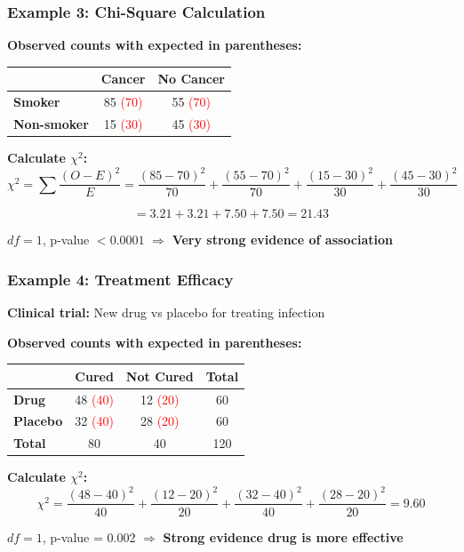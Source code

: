 \documentclass{beamer}
\begin{document}
\begin{frame}
\frametitle{Example 3: Chi-Square Calculation}

\textbf{Observed counts with expected in parentheses:}
\begin{center}
\begin{tabular}{l|cc}
& \textbf{Cancer} & \textbf{No Cancer} \\
\hline
\textbf{Smoker} & 85 \textcolor{red}{(70)} & 55 \textcolor{red}{(70)} \\
\textbf{Non-smoker} & 15 \textcolor{red}{(30)} & 45 \textcolor{red}{(30)} \\
\end{tabular}
\end{center}

\vspace{0.3cm}
\textbf{Calculate $\chi^2$:}
\small
$$\chi^2 = \sum \frac{(O-E)^2}{E} = \frac{(85-70)^2}{70} + \frac{(55-70)^2}{70} + \frac{(15-30)^2}{30} + \frac{(45-30)^2}{30}$$

$$= 3.21 + 3.21 + 7.50 + 7.50 = 21.43$$

\normalsize
$df = 1$, p-value $< 0.0001$ $\Rightarrow$ \textbf{Very strong evidence of association}
\end{frame}

\begin{frame}
\frametitle{Example 4: Treatment Efficacy}
\textbf{Clinical trial:} New drug vs placebo for treating infection

\vspace{0.3cm}
\textbf{Observed counts with expected in parentheses:}
\begin{center}
\begin{tabular}{l|cc|c}
& \textbf{Cured} & \textbf{Not Cured} & \textbf{Total} \\
\hline
\textbf{Drug} & 48 \textcolor{red}{(40)} & 12 \textcolor{red}{(20)} & 60 \\
\textbf{Placebo} & 32 \textcolor{red}{(40)} & 28 \textcolor{red}{(20)} & 60 \\
\hline
\textbf{Total} & 80 & 40 & 120 \\
\end{tabular}
\end{center}

\vspace{0.3cm}
\textbf{Calculate $\chi^2$:}
$$\chi^2 = \frac{(48-40)^2}{40} + \frac{(12-20)^2}{20} + \frac{(32-40)^2}{40} + \frac{(28-20)^2}{20} = 9.60$$

\vspace{0.2cm}
$df = 1$, p-value = 0.002 $\Rightarrow$ \textbf{Strong evidence drug is more effective}
\end{frame}
\end{document}
